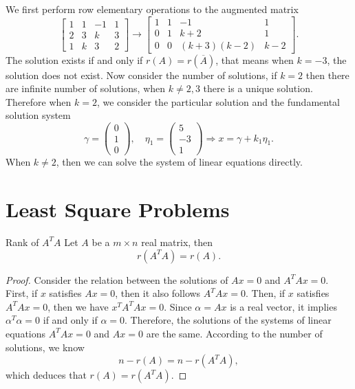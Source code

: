\begin{solution}
  We first perform row elementary operations to the augmented matrix
  \begin{equation}
    \begin{bmatrix}
      1 & 1 & -1 & 1\\
      2 & 3 & k & 3\\
      1 & k & 3 & 2
    \end{bmatrix}
    \rightarrow
    \begin{bmatrix}
      1 & 1 & -1 & 1\\
      0 & 1 & k+2 & 1\\
      0 & 0 & (k+3)(k-2) & k-2
    \end{bmatrix}.
  \end{equation}
  The solution exists if and only if $r(A) = r(\overline{A})$,
  that means when $k = -3$, the solution does not exist.
  Now consider the number of solutions,
  if $k = 2$ then there are infinite number of solutions,
  when $k \neq 2, 3$ there is a unique solution.
  Therefore when $k = 2$, we consider the particular solution
  and the fundamental solution system
  \begin{equation}
    \gamma =
    \begin{pmatrix}
      0 \\
      1 \\
      0
    \end{pmatrix}, \quad
    \eta_1 =
    \begin{pmatrix}
      5 \\
      -3 \\
      1
    \end{pmatrix} \Rightarrow
    x = \gamma + k_1 \eta_1.
  \end{equation}
  When $k \neq 2$, then we can solve the system of linear equations directly.
\end{solution}

\section{Least Square Problems}

\begin{proposition}{Rank of $A^TA$}{}
  Let $A$ be a $m \times n$ real matrix, then
  \begin{equation}
    r(A^TA) = r(A).
  \end{equation}
\end{proposition}

\begin{proof}
  Consider the relation between the solutions of $Ax = 0$ and $A^TA x = 0$.
  First, if $x$ satisfies $Ax = 0$, then it also follows $A^TAx = 0$.
  Then, if $x$ satisfies $A^TAx = 0$, then we have $x^TA^TAx = 0$.
  Since $\alpha = Ax$ is a real vector, it implies $\alpha^T\alpha = 0$
  if and only if $\alpha = 0$.
  Therefore, the solutions of the systems of linear equations $A^TAx = 0$ and
  $Ax = 0$ are the same. According to the number of solutions, we know
  \begin{equation}
    n - r(A) = n - r(A^TA),
  \end{equation}
  which deduces that $r(A) = r(A^TA)$.
\end{proof}

